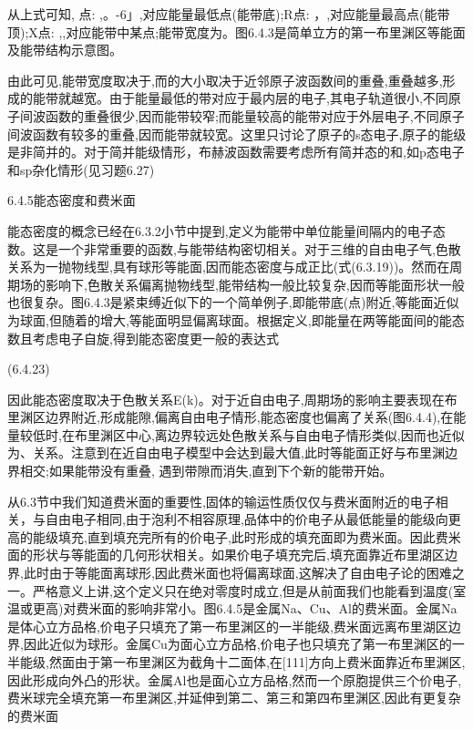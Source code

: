 从上式可知, 点: ,。-6」,对应能量最低点(能带底);R点: ，,对应能量最高点(能带顶);X点: ,,对应能带中某点;能带宽度为。图6.4.3是简单立方的第一布里渊区等能面及能带结构示意图。



由此可见,能带宽度取决于,而的大小取决于近邻原子波函数间的重叠,重叠越多,形成的能带就越宽。由于能量最低的带对应于最内层的电子,其电子轨道很小,不同原子间波函数的重叠很少,因而能带较窄;而能量较高的能带对应于外层电子,不同原子间波函数有较多的重叠,因而能带就较宽。这里只讨论了原子的s态电子,原子的能级是非简并的。对于简并能级情形，布赫波函数需要考虑所有简并态的和,如p态电子和sp杂化情形(见习题6.27)





6.4.5能态密度和费米面

能态密度的概念已经在6.3.2小节中提到,定义为能带中单位能量间隔内的电子态数。这是一个非常重要的函数,与能带结构密切相关。对于三维的自由电子气,色散关系为一抛物线型,具有球形等能面,因而能态密度与成正比(式(6.3.19))。然而在周期场的影响下,色散关系偏离抛物线型,能带结构一般比较复杂,因而等能面形状一般也很复杂。图6.4.3是紧束缚近似下的一个简单例子,即能带底(点)附近,等能面近似为球面,但随着的增大,等能面明显偏离球面。根据定义,即能量在两等能面间的能态数且考虑电子自旋,得到能态密度更一般的表达式

 	(6.4.23)



因此能态密度取决于色散关系E(k)。对于近自由电子,周期场的影响主要表现在布里渊区边界附近,形成能隙,偏离自由电子情形,能态密度也偏离了关系(图6.4.4),在能量较低时,在布里渊区中心,离边界较远处色散关系与自由电子情形类似,因而也近似为、关系。注意到在近自由电子模型中会达到最大值,此时等能面正好与布里渊边界相交;如果能带没有重叠, 遇到带隙而消失,直到下个新的能带开始。

从6.3节中我们知道费米面的重要性,固体的输运性质仅仅与费米面附近的电子相关，与自由电子相同,由于泡利不相容原理,品体中的价电子从最低能量的能级向更高的能级填充,直到填充完所有的价电子,此时形成的填充面即为费米面。因此费米面的形状与等能面的几何形状相关。如果价电子填充完后,填充面靠近布里湖区边界,此时由于等能面离球形,因此费米面也将偏离球面,这解决了自由电子论的困难之一。严格意义上讲,这个定义只在绝对零度时成立,但是从前面我们也能看到温度(室温或更高)对费米面的影响非常小。图6.4.5是金属Na、Cu、Al的费米面。金属Na是体心立方品格,价电子只填充了第一布里渊区的一半能级,费米面远离布里湖区边界,因此近似为球形。金属Cu为面心立方品格,价电子也只填充了第一布里渊区的一半能级,然面由于第一布里渊区为截角十二面体,在[111]方向上费米面靠近布里渊区,因此形成向外凸的形状。金属Al也是面心立方品格,然而一个原胞提供三个价电子,费米球完全填充第一布里渊区,并延伸到第二、第三和第四布里渊区,因此有更复杂的费米面



